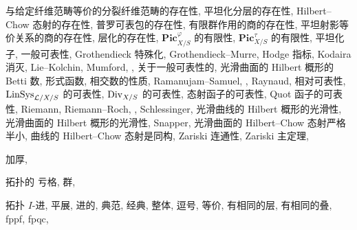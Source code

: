 \begin{theindex}
\subitem 与给定纤维范畴等价的分裂纤维范畴的存在性, 
\subitem 平坦化分层的存在性, 
\subitem Hilbert--Chow 态射的存在性, 
\subitem 普罗可表包的存在性, 
\subitem 有限群作用的商的存在性, 
\subitem 平坦射影等价关系的商的存在性, 
\subitem 层化的存在性, 
\subitem $\mathbf{Pic}_{X/S}^{\varphi}$ 的有限性, 
\subitem $\mathbf{Pic}_{X/S}^{\tau}$ 的有限性, 
\subitem 平坦化子, 
\subitem 一般可表性, 
\subitem Grothendieck 特殊化, 
\subitem Grothendieck--Murre, 
\subitem Hodge 指标, 
\subitem Kodaira 消灭, 
\subitem Lie--Kolchin, 
\subitem Mumford, , 
\subitem 关于一般可表性的, 
\subitem 光滑曲面的 Hilbert 概形的 Betti 数, 
\subitem 形式函数, 
\subitem 相交数的性质, 
\subitem Ramanujam--Samuel, , 
\subitem Raynaud, 
\subitem 相对可表性, 
\subitem $\operatorname{LinSys}_{\mathcal L/X/S}$ 的可表性, 
\subitem $\operatorname{Div}_{X/S}$ 的可表性, 
\subitem 态射函子的可表性, 
\subitem Quot 函子的可表性, 
\subitem Riemann, 
\subitem Riemann--Roch, , 
\subitem Schlessinger, 
\subitem 光滑曲线的 Hilbert 概形的光滑性, 
\subitem 光滑曲面的 Hilbert 概形的光滑性, 
\subitem Snapper, 
\subitem 光滑曲面的 Hilbert--Chow 态射严格半小, 
\subitem 曲线的 Hilbert--Chow 态射是同构, 
\subitem Zariski 连通性, 
\subitem Zariski 主定理, 
\item 加厚, 
\item 拓扑的
\subitem 亏格, 
\subitem 群, 
\item 拓扑
\subitem $I$-进, 
\subitem 平展, 
\subitem 进的, 
\subitem 典范, 
\subitem 经典, 
\subsubitem 整体, 
\subitem 逗号, 
\subitem 等价, 
\subsubitem 有相同的层, 
\subsubitem 有相同的叠, 
\subitem fppf, 
\subitem fpqc, 

\end{theindex}
